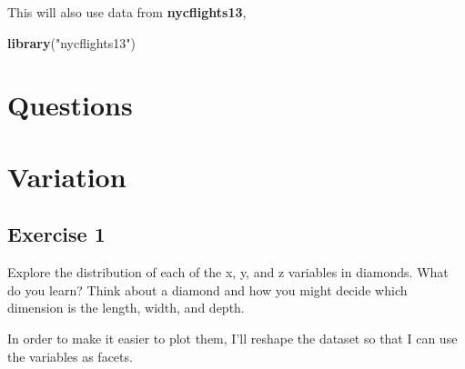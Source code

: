 \documentclass[]{book}
\newenvironment{Shaded}{\begin{snugshade}}{\end{snugshade}}
\newcommand{\DataTypeTok}[1]{\textcolor[rgb]{0.13,0.29,0.53}{#1}}
\newcommand{\KeywordTok}[1]{\textcolor[rgb]{0.13,0.29,0.53}{\textbf{#1}}}
\newcommand{\NormalTok}[1]{#1}
\newcommand{\OperatorTok}[1]{\textcolor[rgb]{0.81,0.36,0.00}{\textbf{#1}}}
\newcommand{\StringTok}[1]{\textcolor[rgb]{0.31,0.60,0.02}{#1}}
\theoremstyle{definition}
\theoremstyle{definition}
\theoremstyle{definition}
\theoremstyle{remark}
\begin{document}
This will also use data from \textbf{nycflights13},

\begin{Shaded}
\begin{Highlighting}[]
\KeywordTok{library}\NormalTok{(}\StringTok{"nycflights13"}\NormalTok{)}
\end{Highlighting}
\end{Shaded}

\hypertarget{questions}{%
\section{Questions}\label{questions}}

\hypertarget{variation}{%
\section{Variation}\label{variation}}

\hypertarget{exercise-1-8}{%
\subsection{Exercise 1}\label{exercise-1-8}}

Explore the distribution of each of the x, y, and z variables in
diamonds. What do you learn? Think about a diamond and how you might
decide which dimension is the length, width, and depth.

In order to make it easier to plot them, I'll reshape the dataset so
that I can use the variables as facets.

\begin{Shaded}
\end{Shaded}
\end{document}
